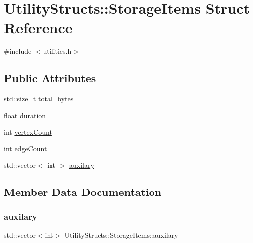 \hypertarget{struct_utility_structs_1_1_storage_items}{}\section{Utility\+Structs\+:\+:Storage\+Items Struct Reference}
\label{struct_utility_structs_1_1_storage_items}


{\ttfamily \#include $<$utilities.\+h$>$}

\subsection*{Public Attributes}
\begin{DoxyCompactItemize}
\item 
std\+::size\+\_\+t \hyperlink{struct_utility_structs_1_1_storage_items_a39cf482db54d8e6ac473b438444c8a1e_a39cf482db54d8e6ac473b438444c8a1e}{total\+\_\+bytes}
\item 
float \hyperlink{struct_utility_structs_1_1_storage_items_a65e7df5611a4e144cc27576bd3041f6c_a65e7df5611a4e144cc27576bd3041f6c}{duration}
\item 
int \hyperlink{struct_utility_structs_1_1_storage_items_af72522be713f23fcfe3ac66780183fda_af72522be713f23fcfe3ac66780183fda}{vertex\+Count}
\item 
int \hyperlink{struct_utility_structs_1_1_storage_items_afafcba9bb103108e2c1e1d9254fb75c5_afafcba9bb103108e2c1e1d9254fb75c5}{edge\+Count}
\item 
std\+::vector$<$ int $>$ \hyperlink{struct_utility_structs_1_1_storage_items_afb9d346eaacb1c5e7f60f559c45910f2_afb9d346eaacb1c5e7f60f559c45910f2}{auxilary}
\end{DoxyCompactItemize}


\subsection{Member Data Documentation}
\mbox{\label{struct_utility_structs_1_1_storage_items_afb9d346eaacb1c5e7f60f559c45910f2_afb9d346eaacb1c5e7f60f559c45910f2}} 
\subsubsection{\texorpdfstring{auxilary}{auxilary}}
{\footnotesize\ttfamily std\+::vector$<$int$>$ Utility\+Structs\+::\+Storage\+Items\+::auxilary}

